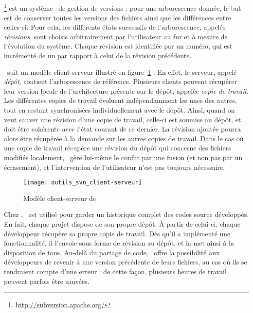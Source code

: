 \subsection{\asvn}
\label{section:outils_svn}

\asvn\footnote{\url{http://subversion.apache.org/}} est un système \aos\ de gestion de versions : pour une arborescence donnée, le but est de conserver toutes les versions des fichiers ainsi que les différences entre celles-ci. Pour cela, les différents états successifs de l'arborescence, appelés \emph{révisions}, sont choisis arbitrairement par l'utilisateur au fur et à mesure de l'évolution du système. Chaque révision est identifiée par un numéro, qui est incrémenté de un par rapport à celui de la révision précédente.

\asvn\ suit un modèle client-serveur illustré en figure~\ref{figure:outils_svn_client-serveur} . En effet, le serveur, appelé \emph{dépôt}, contient l'arborescence de référence. Plusieurs clients peuvent récupérer leur version locale de l'architecture présente sur le dépôt, appelée \emph{copie de travail}. Les différentes copies de travail évoluent indépendamment les unes des autres, tout en restant synchronisées individuellement avec le dépôt. Ainsi, quand on veut sauver une révision d'une copie de travail, celle-ci est soumise au dépôt, et doit être cohérente avec l'état courant de ce dernier. La révision ajoutée pourra alors être récupérée à la demande sur les autres copies de travail. Dans le cas où une copie de travail récupère une révision du dépôt qui concerne des fichiers modifiés localement, \asvn\ gère lui-même le conflit par une fusion (et non pas par un écrasement), et l'intervention de l'utilisateur n'est pas toujours nécessaire.

\begin{figure}
	\centering
	\texttt{[image: outils\_svn\_client-serveur]}
	\caption{Modèle client-serveur de \asvn}
	\label{figure:outils_svn_client-serveur}
\end{figure}

Chez \asl, \asvn\ est utilisé pour garder un historique complet des codes source développés. En fait, chaque projet dispose de son propre dépôt. À partir de celui-ci, chaque développeur récupère sa propre copie de travail. Dès qu'il a implémenté une fonctionnalité, il l'envoie sous forme de révision au dépôt, et la met ainsi à la disposition de tous. Au-delà du partage de code, \asvn\ offre la possibilité aux développeurs de revenir à une version précédente de leurs fichiers, au cas où ils se rendraient compte d'une erreur : de cette façon, plusieurs heures de travail peuvent parfois être sauvées.

